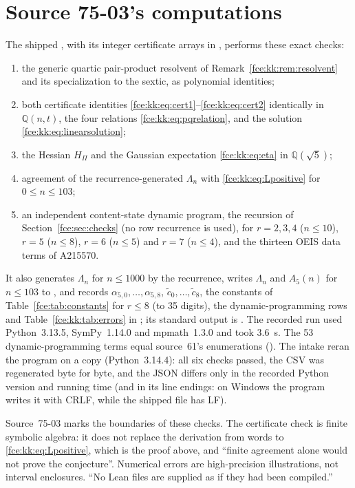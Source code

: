 \documentclass[11pt,a4paper]{article}
\numberwithin{equation}{section}
\theoremstyle{definition}\newtheorem{definition}[theorem]{Definition}
\theoremstyle{remark}\newtheorem{remark}[theorem]{Remark}
\newcommand{\Q}{\mathbb Q}
\begin{document}
\section{Source 75-03's computations}\label{fce:kk:sec:checks}
The shipped , with its integer
certificate arrays in ,
performs these exact checks:
\begin{enumerate}[label=(\alph*)]
\item the generic quartic pair-product resolvent of
Remark~\ref{fce:kk:rem:resolvent} and its specialization to the sextic, as
polynomial identities;
\item both certificate identities \eqref{fce:kk:eq:cert1}--\eqref{fce:kk:eq:cert2}
identically in $\Q(n,t)$, the four relations \eqref{fce:kk:eq:pqrelation},
and the solution \eqref{fce:kk:eq:linearsolution};
\item the Hessian $H_\Pi$ and the Gaussian expectation \eqref{fce:kk:eq:eta}
in $\Q(\sqrt5)$;
\item agreement of the recurrence-generated $\Lambda_n$ with
\eqref{fce:kk:eq:Lpositive} for $0\le n\le103$;
\item an independent content-state dynamic program, the recursion of
Section~\ref{fce:sec:checks} (no row recurrence is used), for $r=2,3,4$
($n\le10$), $r=5$ ($n\le8$), $r=6$ ($n\le5$) and $r=7$ ($n\le4$), and the
thirteen OEIS data terms of A215570.
\end{enumerate}
It also generates $\Lambda_n$ for $n\le1000$ by the recurrence, writes
$\Lambda_n$ and $A_5(n)$ for $n\le103$ to
, and records
$\alpha_{5,0},\ldots,\alpha_{5,8}$, $\tilde c_0,\ldots,\tilde c_8$, the
constants of Table~\ref{fce:tab:constants} for $r\le8$ (to 35 digits),
the dynamic-programming rows and Table~\ref{fce:kk:tab:errors} in
; its standard output
is . The recorded run used
Python~3.13.5, SymPy~1.14.0 and mpmath~1.3.0 and took 3.6~s. The 53
dynamic-programming terms equal source~61's enumerations
(). The intake reran the program on a
copy (Python~3.14.4): all six checks passed, the CSV was regenerated
byte for byte, and the JSON differs only in the recorded Python version and
running time (and in its line endings: on Windows the program writes it
with CRLF, while the shipped file has LF).

Source~75-03 marks the boundaries of these checks. The certificate check is
finite symbolic algebra: it does not replace the derivation from words to
\eqref{fce:kk:eq:Lpositive}, which is the proof above, and ``finite
agreement alone would not prove the conjecture''. Numerical errors are
high-precision illustrations, not interval enclosures. ``No Lean files are
supplied as if they had been compiled.''
\end{document}
